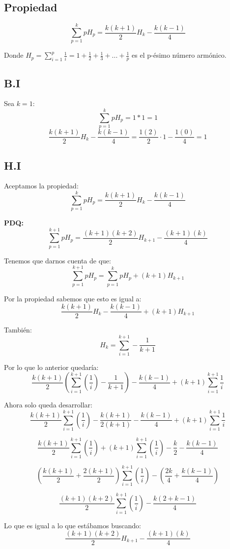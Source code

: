 \documentclass[../doc.tex]{subfiles}
\begin{document}
\subsection{Propiedad}
\[\sum_{p=1}^{k} pH_p = \frac{k(k + 1)}{2}H_k - \frac{k(k-1)}{4}\]

Donde \(H_p = \sum_{i=1}^{p} \frac{1}{i} = 1 + \frac{1}{2} + \frac{1}{3}
+ ... +\frac{1}{p}\) es el p-ésimo número armónico.

\subsection{B.I}
Sea \(k = 1\):
\[\sum_{p=1}^{k} pH_p = 1*1 = 1\]
\[\frac{k(k + 1)}{2}H_k - \frac{k(k-1)}{4} = \frac{1(2)}{2} \cdot 1 - \frac{1(0)}{4} = 1\]

\subsection{H.I}
Aceptamos la propiedad:
\[\sum_{p=1}^{k} pH_p = \frac{k(k + 1)}{2}H_k - \frac{k(k-1)}{4}\]

\textbf{PDQ:}
\[\sum_{p=1}^{k+1} pH_p = \frac{(k+1)(k+2)}{2}H_{k+1} - \frac{(k+1)(k)}{4}\]

\noindent Tenemos que darnos cuenta de que:
\[\sum_{p=1}^{k+1} pH_p = \sum_{p=1}^{k} pH_p + (k+1)H_{k+1}\]

\noindent Por la propiedad sabemos que esto es igual a:
\[\frac{k(k + 1)}{2}H_k - \frac{k(k-1)}{4} + (k+1)H_{k+1}\]

\noindent También:
\[ H_{k} = \sum_{i=1}^{k+1} - \frac{1}{k+1}\]

\noindent Por lo que lo anterior quedaría:
\[\frac{k(k + 1)}{2}(\sum_{i=1}^{k+1} (\frac{1}{i}) - \frac{1}{k+1})
- \frac{k(k-1)}{4} + (k+1)\sum_{i=1}^{k+1} \frac{1}{i}\]

\noindent Ahora solo queda desarrollar:
\[\frac{k(k + 1)}{2}\sum_{i=1}^{k+1} (\frac{1}{i}) - \frac{k(k + 1)}{2(k+1)}
- \frac{k(k-1)}{4} + (k+1)\sum_{i=1}^{k+1} \frac{1}{i}\]

\[\frac{k(k + 1)}{2}\sum_{i=1}^{k+1} (\frac{1}{i})
+ (k+1)\sum_{i=1}^{k+1} (\frac{1}{i}) - \frac{k}{2} - \frac{k(k-1)}{4}\]

\[(\frac{k(k + 1)}{2} + \frac{2(k+1)}{2})\sum_{i=1}^{k+1} (\frac{1}{i})
- (\frac{2k}{4} + \frac{k(k-1)}{4})\]

\[\frac{(k + 1)(k + 2)}{2}\sum_{i=1}^{k+1} (\frac{1}{i}) - \frac{k(2 + k - 1)}{4}\]

\noindent Lo que es igual a lo que estábamos buscando:
\[\frac{(k+1)(k+2)}{2}H_{k+1} - \frac{(k+1)(k)}{4}\]
\end{document}

